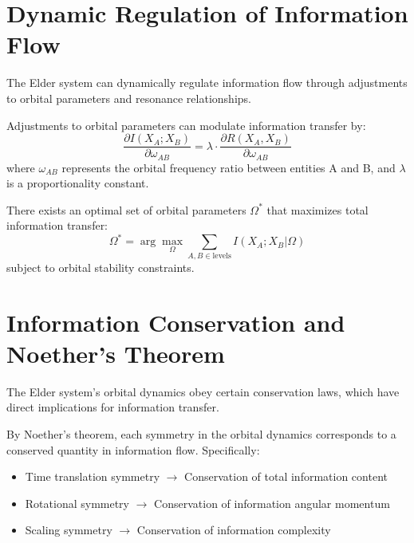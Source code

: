 \section{Dynamic Regulation of Information Flow}

The Elder system can dynamically regulate information flow through adjustments to orbital parameters and resonance relationships.

\begin{theorem}
Adjustments to orbital parameters can modulate information transfer by:
\begin{equation}
\frac{\partial I(X_A; X_B)}{\partial \omega_{AB}} = \lambda \cdot \frac{\partial R(X_A, X_B)}{\partial \omega_{AB}}
\end{equation}
where $\omega_{AB}$ represents the orbital frequency ratio between entities A and B, and $\lambda$ is a proportionality constant.
\end{theorem}

\begin{theorem}
There exists an optimal set of orbital parameters $\Omega^*$ that maximizes total information transfer:
\begin{equation}
\Omega^* = \arg\max_{\Omega} \sum_{A,B \in \text{levels}} I(X_A; X_B|\Omega)
\end{equation}
subject to orbital stability constraints.
\end{theorem}

\section{Information Conservation and Noether's Theorem}

The Elder system's orbital dynamics obey certain conservation laws, which have direct implications for information transfer.

\begin{theorem}
By Noether's theorem, each symmetry in the orbital dynamics corresponds to a conserved quantity in information flow. Specifically:
\begin{itemize}
    \item Time translation symmetry $\to$ Conservation of total information content
    \item Rotational symmetry $\to$ Conservation of information angular momentum
    \item Scaling symmetry $\to$ Conservation of information complexity
\end{itemize}
\end{theorem}

